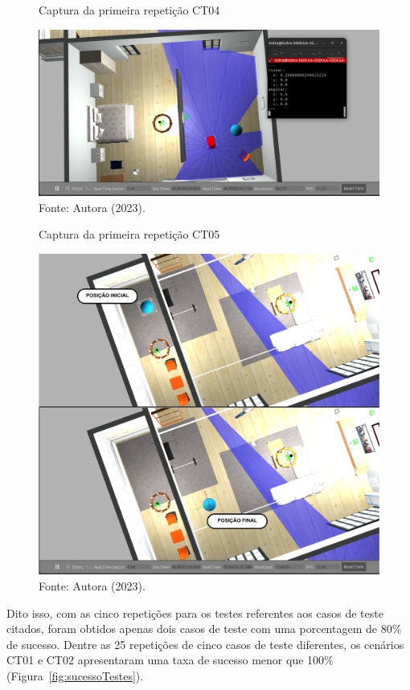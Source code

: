 \begin{figure}[H]
    \centering
    \caption{Captura da primeira repetição CT04}
    \includegraphics[scale=0.33]{ct04_1.png}
    \caption*{Fonte: Autora (2023).}
    \label{fig:teste1CT04}
\end{figure}

\begin{figure}[H]
    \centering
    \caption{Captura da primeira repetição CT05}
    \includegraphics[scale=0.4]{ct05_1.png}
    \caption*{Fonte: Autora (2023).}
    \label{fig:teste1CT05}
\end{figure}

Dito isso, com as cinco repetições para os testes referentes aos casos de teste citados, foram obtidos apenas dois casos de teste com uma porcentagem de 80\% de sucesso. Dentre as 25 repetições de cinco casos de teste diferentes, os cenários CT01 e CT02  apresentaram uma taxa de sucesso menor que 100\%  (Figura~\ref{fig:sucessoTestes}).

